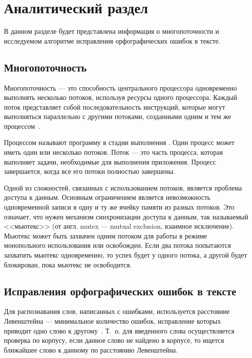 \chapter{Аналитический раздел}

В данном разделе будет представлена информация о многопоточности и исследуемом алгоритме исправления орфографических ошибок в тексте.

\section{Многопоточность} 

Многопоточность --- это способность центрального процессора одновременно выполнять несколько потоков, используя ресурсы одного процессора. Каждый поток представляет собой последовательность инструкций, которые могут выполняться параллельно с другими потоками, созданными одним и тем же процессом~\cite{multithreading}.

Процессом называют программу в стадии выполнения \cite{process}. Один процесс может иметь один или несколько потоков. 
Поток --- это часть процесса, которая выполняет задачи, необходимые для выполнения приложения. 
Процесс завершается, когда все его потоки полностью завершены. 

Одной из сложностей, связанных с использованием потоков, является проблема доступа к данным. 
Основным ограничением является невозможность одновременной записи в одну и ту же ячейку памяти из разных потоков.
Это означает, что нужен механизм синхронизации доступа к данным, так называемый <<мьютекс>> (от англ. mutex --- mutual exclusion, взаимное исключение). 
Мьютекс может быть захвачен одним потоком для работы в режиме монопольного использования или освобожден. 
Если два потока попытаются захватить мьютекс одновременно, то успех будет у одного потока, а другой будет блокирован, пока мьютекс не освободится.

\section{Исправления орфографических ошибок в тексте}

Для распознавания слов, написанных с ошибками, используется расстояние
Левенштейна --- минимальное количество ошибок, исправление которых приводит
одно слово к другому~\cite{miem}. 
Т.~о. для введенного слова осуществляется проверка по корпусу, если данное слово не найдено в корпусе, то ищется ближайшее слово к данному по расстоянию Левенштейна. 

